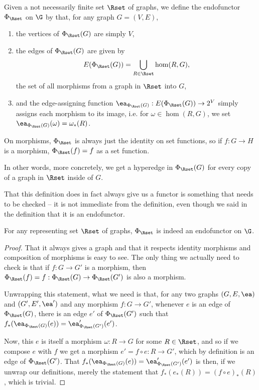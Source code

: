 \documentclass[a4paper,reqno,oneside]{article} %
\begin{document}
\begin{definition}
    Given a not necessarily finite set $\Rset$ of graphs, we define the endofunctor $\Phi_\Rset$ on $\G$ by that, for any graph $G = (V,E)$,
    \begin{enumerate}
        \item the vertices of $\Phi_\Rset(G)$ are simply $V$,
        \item the edges of $\Phi_\Rset(G)$ are given by
        $$E(\Phi_\Rset(G)) = \bigcup_{R \in \Rset} \hom(R, G),$$
        the set of all morphisms from a graph in $\Rset$ into $G$,
        \item and the edge-assigning function $\ea_{\Phi_\Rset(G)}: E(\Phi_\Rset(G)) \to 2^V$ simply assigns each morphism to its image, i.e. for $\omega \in \hom(R, G)$, we set $\ea_{\Phi_\Rset(G)}(\omega) = \omega_*(R)$.
    \end{enumerate}

    On morphisms, $\Phi_\Rset$ is always just the identity on set functions, so if $f: G \to H$ is a morphism, $\Phi_\Rset(f) = f$ as a set function.
\end{definition}

In other words, more concretely, we get a hyperedge in $\Phi_\Rset(G)$ for every copy of a graph in $\Rset$ inside of $G$.

That this definition does in fact always give us a functor is something that needs to be checked -- it is not immediate from the definition, even though we said in the definition that it is an endofunctor.

\begin{lemma}\label{lemma_representable_endofunctor_is_functor}
    For any representing set $\Rset$ of graphs, $\Phi_\Rset$ is indeed an endofunctor on $\G$.

    \begin{proof}
        That it always gives a graph and that it respects identity morphisms and composition of morphisms is easy to see. The only thing we actually need to check is that if $f: G \to G'$ is a morphism, then $\Phi_\Rset(f) = f: \Phi_\Rset(G) \to \Phi_\Rset(G')$ is also a morphism.

        Unwrapping this statement, what we need is that, for any two graphs $(G, E, \ea)$ and $(G', E', \ea')$ and any morphism $f: G \to G'$, whenever $e$ is an edge of $\Phi_\Rset(G)$, there is an edge $e'$ of $\Phi_\Rset(G')$ such that $f_*(\ea_{\Phi_\Rset(G)}(e)) = \ea'_{\Phi_\Rset(G')}(e')$.

        Now, this $e$ is itself a morphism $\omega: R \to G$ for some $R \in \Rset$, and so if we compose $e$ with $f$ we get a morphism $e' = f \circ e: R \to G'$, which by definition is an edge of $\Phi_\Rset(G')$. That $f_*(\ea_{\Phi_\Rset(G)}(e)) = \ea'_{\Phi_\Rset(G')}(e')$ is then, if we unwrap our definitions, merely the statement that $f_*(e_*(R)) = (f \circ e)_*(R)$, which is trivial.
    \end{proof}
\end{lemma}
\end{document}
